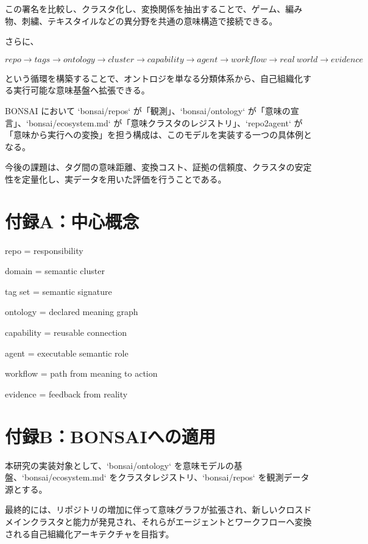 \documentclass[a4paper,11pt]{jsarticle}
\begin{document}
この署名を比較し、クラスタ化し、変換関係を抽出することで、ゲーム、編み物、刺繍、テキスタイルなどの異分野を共通の意味構造で接続できる。


さらに、


\[


repo \rightarrow tags \rightarrow ontology \rightarrow cluster


\rightarrow capability \rightarrow agent \rightarrow workflow


\rightarrow real\ world \rightarrow evidence


\]


という循環を構築することで、オントロジを単なる分類体系から、自己組織化する実行可能な意味基盤へ拡張できる。


BONSAI において `bonsai/repos` が「観測」、`bonsai/ontology` が「意味の宣言」、`bonsai/ecosystem.md` が「意味クラスタのレジストリ」、`repo2agent` が「意味から実行への変換」を担う構成は、このモデルを実装する一つの具体例となる。


今後の課題は、タグ間の意味距離、変換コスト、証拠の信頼度、クラスタの安定性を定量化し、実データを用いた評価を行うことである。


\section{付録A：中心概念}
repo        = responsibility


domain      = semantic cluster


tag set     = semantic signature


ontology    = declared meaning graph


capability  = reusable connection


agent       = executable semantic role


workflow    = path from meaning to action


evidence    = feedback from reality


\section{付録B：BONSAIへの適用}
本研究の実装対象として、`bonsai/ontology` を意味モデルの基盤、`bonsai/ecosystem.md` をクラスタレジストリ、`bonsai/repos` を観測データ源とする。


最終的には、リポジトリの増加に伴って意味グラフが拡張され、新しいクロスドメインクラスタと能力が発見され、それらがエージェントとワークフローへ変換される自己組織化アーキテクチャを目指す。
\end{document}
